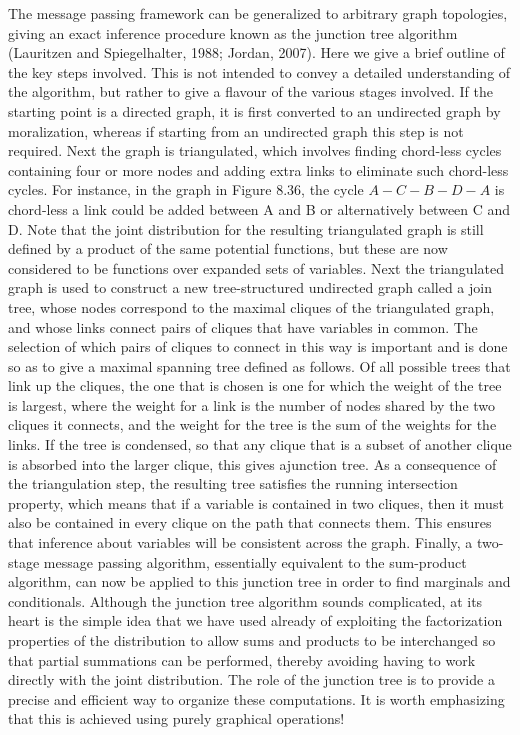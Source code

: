 \documentclass[
  10
]{article}
\begin{document}
The message passing framework can be generalized to arbitrary graph
topologies, giving an exact inference procedure known as the junction
tree algorithm (Lauritzen and Spiegelhalter, 1988; Jordan, 2007). Here
we give a brief outline of the key steps involved. This is not intended
to convey a detailed understanding of the algorithm, but rather to give
a flavour of the various stages involved. If the starting point is a
directed graph, it is first converted to an undirected graph by
moralization, whereas if starting from an undirected graph this step is
not required. Next the graph is triangulated, which involves finding
chord-less cycles containing four or more nodes and adding extra links
to eliminate such chord-less cycles. For instance, in the graph in
Figure 8.36, the cycle \(A { - } C { - } B { - } D { - } A\) is
chord-less a link could be added between A and B or alternatively
between C and D. Note that the joint distribution for the resulting
triangulated graph is still defined by a product of the same potential
functions, but these are now considered to be functions over expanded
sets of variables. Next the triangulated graph is used to construct a
new tree-structured undirected graph called a join tree, whose nodes
correspond to the maximal cliques of the triangulated graph, and whose
links connect pairs of cliques that have variables in common. The
selection of which pairs of cliques to connect in this way is important
and is done so as to give a maximal spanning tree defined as follows. Of
all possible trees that link up the cliques, the one that is chosen is
one for which the weight of the tree is largest, where the weight for a
link is the number of nodes shared by the two cliques it connects, and
the weight for the tree is the sum of the weights for the links. If the
tree is condensed, so that any clique that is a subset of another clique
is absorbed into the larger clique, this gives ajunction tree. As a
consequence of the triangulation step, the resulting tree satisfies the
running intersection property, which means that if a variable is
contained in two cliques, then it must also be contained in every clique
on the path that connects them. This ensures that inference about
variables will be consistent across the graph. Finally, a two-stage
message passing algorithm, essentially equivalent to the sum-product
algorithm, can now be applied to this junction tree in order to find
marginals and conditionals. Although the junction tree algorithm sounds
complicated, at its heart is the simple idea that we have used already
of exploiting the factorization properties of the distribution to allow
sums and products to be interchanged so that partial summations can be
performed, thereby avoiding having to work directly with the joint
distribution. The role of the junction tree is to provide a precise and
efficient way to organize these computations. It is worth emphasizing
that this is achieved using purely graphical operations!
\end{document}
